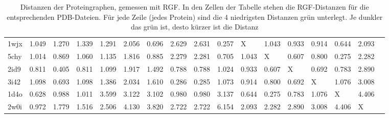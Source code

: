 \documentclass{report}
\begin{document}
\begin{table}
{\begin{tabular}{l l l l l l l l l l l l l l l l l}
1wjx & 1.049 & 1.270 & 1.339 & 1.291 & 2.056 & \cellcolor{fGreen!50}0.696 & 2.629 & 2.631 & \cellcolor{fGreen!100}0.257 &   X   & 1.043 & 0.933 & \cellcolor{fGreen!25}0.914 & \cellcolor{fGreen!75}0.644 & 2.093 &  \\
5chy & 1.014 & 0.869 & 1.060 & 1.135 & 1.816 & 0.885 & 2.279 & 2.281 & \cellcolor{fGreen!50}0.705 & 1.043 &   X   & \cellcolor{fGreen!75}0.607 & \cellcolor{fGreen!25}0.800 & \cellcolor{fGreen!100}0.275 & 2.282 &  \\
2id9 & 0.811 & \cellcolor{fGreen!100}0.405 & 0.811 & 1.099 & 1.917 & 1.492 & 0.788 & 0.788 & 1.024 & 0.933 & \cellcolor{fGreen!75}0.607 &   X   & \cellcolor{fGreen!50}0.692 & \cellcolor{fGreen!25}0.783 & 2.890 &  \\
3i42 & 1.098 & \cellcolor{fGreen!25}0.693 & 1.098 & 1.386 & 2.034 & 1.610 & \cellcolor{fGreen!75}0.286 & \cellcolor{fGreen!100}0.285 & 1.073 & 0.914 & 0.800 & \cellcolor{fGreen!50}0.692 &   X   & 1.076 & 3.008 &  \\
1d4o & \cellcolor{fGreen!75}0.628 & 0.988 & 1.011 & 3.599 & 3.122 & 3.102 & 0.980 & 0.980 & 3.137 & \cellcolor{fGreen!50}0.644 & \cellcolor{fGreen!100}0.275 & \cellcolor{fGreen!25}0.783 & 1.076 &   X   & 4.406 &  \\
2w0i & \cellcolor{fGreen!100}0.972 & \cellcolor{fGreen!50}1.779 & \cellcolor{fGreen!75}1.516 & 2.506 & 4.130 & 3.820 & 2.722 & 2.722 & 6.154 & \cellcolor{fGreen!25}2.093 & 2.282 & 2.890 & 3.008 & 4.406 &   X   &  \\


\end{tabular}}
\caption{Distanzen der Proteingraphen, gemessen mit RGF. In den Zellen der Tabelle stehen die RGF-Distanzen f\"ur die entsprechenden PDB-Dateien. F\"ur jede Zeile (jedes Protein) sind die 4 niedrigsten Distanzen gr\"un unterlegt. Je dunkler das gr\"un ist, desto k\"urzer ist die Distanz}
\end{table}
\end{document}
